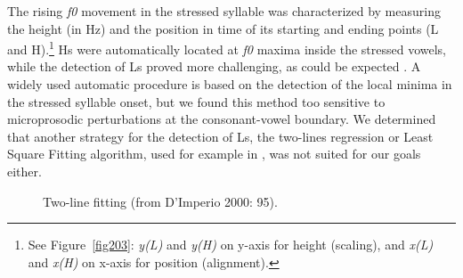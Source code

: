 The rising \textit{f0} movement in the stressed syllable was characterized by measuring the height (in Hz) and the position in time of its starting and ending points (L and H).\footnote{See Figure~\ref{fig203}: \textit{y(L)} and \textit{y(H)} on y-axis for height (scaling), and \textit{x(L)} and \textit{x(H)} on x-axis for position (alignment).} Hs were automatically located at \textit{f0} maxima inside the stressed vowels, while the detection of Ls proved more challenging, as could be expected \citep{delgiudice2007comparing,petrone2009tonal}. A widely used automatic procedure is based on the detection of the local minima in the stressed syllable onset, but we found this method too sensitive to microprosodic perturbations at the consonant-vowel boundary. We determined that another strategy for the detection of Ls, the two-lines regression or Least Square Fitting algorithm, used for example in \citet[92-93]{dimperio2000role}, was not suited for our goals either.

\begin{figure}
\centering
{}
\caption{Two-line fitting (from D'Imperio 2000: 95).}
\label{fig204}\end{figure}

